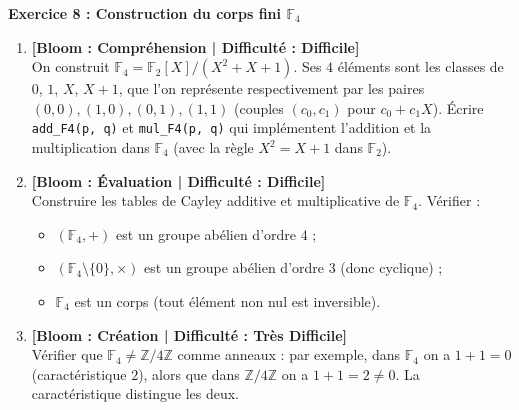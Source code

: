 \noindent\textbf{Exercice 8 : Construction du corps fini $\mathbb{F}_4$}
\begin{enumerate}
    \item \textbf{[Bloom : Compréhension | Difficulté : Difficile]} \\
    On construit $\mathbb{F}_4 = \mathbb{F}_2[X] / (X^2 + X + 1)$. Ses $4$ éléments sont les classes de $0$, $1$, $X$, $X + 1$, que l'on représente respectivement par les paires $(0, 0), (1, 0), (0, 1), (1, 1)$ (couples $(c_0, c_1)$ pour $c_0 + c_1 X$).
    Écrire \texttt{add\_F4(p, q)} et \texttt{mul\_F4(p, q)} qui implémentent l'addition et la multiplication dans $\mathbb{F}_4$ (avec la règle $X^2 = X + 1$ dans $\mathbb{F}_2$).
    \item \textbf{[Bloom : Évaluation | Difficulté : Difficile]} \\
    Construire les tables de Cayley additive et multiplicative de $\mathbb{F}_4$. Vérifier :
    \begin{itemize}
        \item $(\mathbb{F}_4, +)$ est un groupe abélien d'ordre $4$ ;
        \item $(\mathbb{F}_4 \setminus \{0\}, \times)$ est un groupe abélien d'ordre $3$ (donc cyclique) ;
        \item $\mathbb{F}_4$ est un corps (tout élément non nul est inversible).
    \end{itemize}
    \item \textbf{[Bloom : Création | Difficulté : Très Difficile]} \\
    Vérifier que $\mathbb{F}_4 \neq \mathbb{Z}/4\mathbb{Z}$ comme anneaux : par exemple, dans $\mathbb{F}_4$ on a $1 + 1 = 0$ (caractéristique $2$), alors que dans $\mathbb{Z}/4\mathbb{Z}$ on a $1 + 1 = 2 \neq 0$. La caractéristique distingue les deux.
\end{enumerate}
